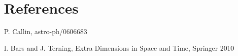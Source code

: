 \documentclass{aa}   %
\begin{document}
\section{References}
\begin{enumerate}[label= {[}\arabic*{]} ]
 \item P. Callin, astro-ph/0606683
 \item I. Bars and J. Terning, Extra Dimensions in Space and Time, Springer 2010
\end{enumerate}



%

\onecolumn 
\end{document}
